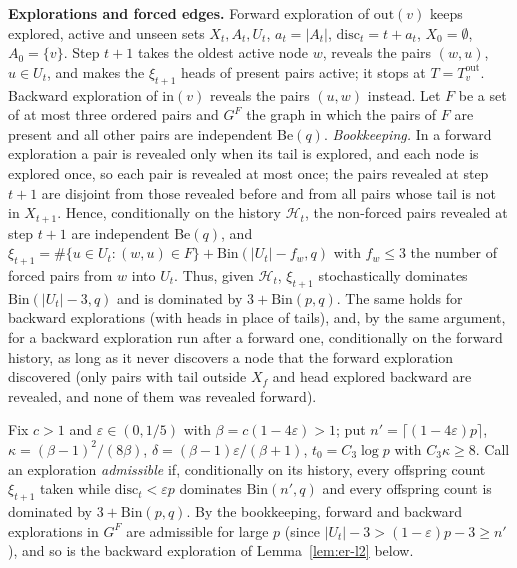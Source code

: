 \textbf{Explorations and forced edges.} Forward exploration of $\mathrm{out}(v)$
keeps explored, active and unseen sets $X_t,A_t,U_t$, $a_t=|A_t|$,
$\mathrm{disc}_t=t+a_t$, $X_0=\emptyset$, $A_0=\{v\}$. Step $t+1$ takes the
oldest active node $w$, reveals the pairs $(w,u)$, $u\in U_t$, and makes the
$\xi_{t+1}$ heads of present pairs active; it stops at $T=T^{\mathrm{out}}_v$.
Backward exploration of $\mathrm{in}(v)$ reveals the pairs $(u,w)$ instead.
Let $F$ be a set of at most three ordered pairs and $G^F$ the graph in which the
pairs of $F$ are present and all other pairs are independent Be$(q)$.
\emph{Bookkeeping.} In a forward exploration a pair is revealed only when its
tail is explored, and each node is explored once, so each pair is revealed at
most once; the pairs revealed at step $t+1$ are disjoint from those revealed
before and from all pairs whose tail is not in $X_{t+1}$. Hence, conditionally
on the history $\mathcal H_t$, the non-forced pairs revealed at step $t+1$ are
independent Be$(q)$, and
$\xi_{t+1}=\#\{u\in U_t:(w,u)\in F\}+\mathrm{Bin}(|U_t|-f_w,q)$ with
$f_w\le3$ the number of forced pairs from $w$ into $U_t$. Thus, given
$\mathcal H_t$, $\xi_{t+1}$ stochastically dominates $\mathrm{Bin}(|U_t|-3,q)$
and is dominated by $3+\mathrm{Bin}(p,q)$. The same holds for backward
explorations (with heads in place of tails), and, by the same argument, for a
backward exploration run after a forward one, conditionally on the forward
history, as long as it never discovers a node that the forward exploration
discovered (only pairs with tail outside $X_f$ and head explored backward are
revealed, and none of them was revealed forward).

Fix $c>1$ and $\varepsilon\in(0,1/5)$ with $\beta=c(1-4\varepsilon)>1$; put
$n'=\lceil(1-4\varepsilon)p\rceil$, $\kappa=(\beta-1)^2/(8\beta)$,
$\delta=(\beta-1)\varepsilon/(\beta+1)$, $t_0=C_3\log p$ with $C_3\kappa\ge8$.
Call an exploration \emph{admissible} if, conditionally on its history, every
offspring count $\xi_{t+1}$ taken while $\mathrm{disc}_t<\varepsilon p$
dominates $\mathrm{Bin}(n',q)$ and every offspring count is dominated by
$3+\mathrm{Bin}(p,q)$. By the bookkeeping, forward and backward explorations in
$G^F$ are admissible for large $p$ (since $|U_t|-3>(1-\varepsilon)p-3\ge n'$),
and so is the backward exploration of Lemma~\ref{lem:er-l2} below.

